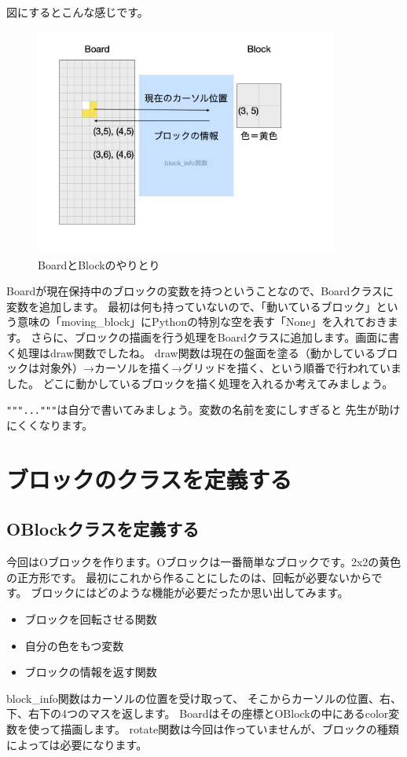 図にするとこんな感じです。
\begin{figure}[h]
  \centering
  \includegraphics[width=100mm]{images/BoardAndBlock.png}
  \caption{BoardとBlockのやりとり}
\end{figure}

Boardが現在保持中のブロックの変数を持つということなので、Boardクラスに変数を追加します。
最初は何も持っていないので、「動いているブロック」という意味の「moving\_block」にPythonの特別な空を表す「None」を入れておきます。
さらに、ブロックの描画を行う処理をBoardクラスに追加します。画面に書く処理はdraw関数でしたね。
draw関数は現在の盤面を塗る（動かしているブロックは対象外）→カーソルを描く→グリッドを描く、という順番で行われていました。
どこに動かしているブロックを描く処理を入れるか考えてみましょう。

\texttt{"""..."""}は自分で書いてみましょう。変数の名前を変にしすぎると
先生が助けにくくなります。

\section{ブロックのクラスを定義する}
\subsection{OBlockクラスを定義する}
今回はOブロックを作ります。Oブロックは一番簡単なブロックです。2x2の黄色の正方形です。
最初にこれから作ることにしたのは、回転が必要ないからです。
ブロックにはどのような機能が必要だったか思い出してみます。
\begin{itemize}
  \item ブロックを回転させる関数
  \item 自分の色をもつ変数
  \item ブロックの情報を返す関数
\end{itemize}
\newpage

block\_info関数はカーソルの位置を受け取って、
そこからカーソルの位置、右、下、右下の4つのマスを返します。
Boardはその座標とOBlockの中にあるcolor変数を使って描画します。
rotate関数は今回は作っていませんが、ブロックの種類によっては必要になります。

